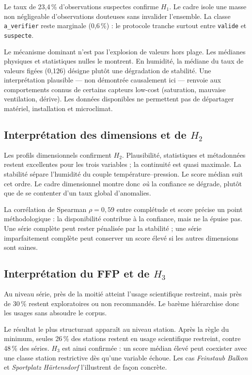 Le taux de 23,4\,\% d'observations suspectes confirme $H_1$. Le cadre isole une
masse non négligeable d'observations douteuses sans invalider l'ensemble. La
classe \texttt{a\_verifier} reste marginale (0,6\,\%) : le protocole tranche
surtout entre \texttt{valide} et \texttt{suspecte}.

Le mécanisme dominant n'est pas l'explosion de valeurs hors plage. Les médianes
physiques et statistiques nulles le montrent. En humidité, la médiane du taux
de valeurs figées (0,126) désigne plutôt une dégradation de stabilité. Une
interprétation plausible --- non démontrée causalement ici --- renvoie aux
comportements connus de certains capteurs low-cost (saturation, mauvaise
ventilation, dérive). Les données disponibles ne permettent pas de départager
matériel, installation et microclimat.

\subsection{Interprétation des dimensions et de $H_2$}

Les profils dimensionnels confirment $H_2$. Plausibilité, statistiques et
métadonnées restent excellentes pour les trois variables ; la continuité est
quasi maximale. La stabilité sépare l'humidité du couple température--pression.
Le score médian suit cet ordre. Le cadre dimensionnel montre donc
\textit{où} la confiance se dégrade, plutôt que de se contenter d'un taux
global d'anomalies.

La corrélation de Spearman $\rho=0,59$ entre complétude et score précise un
point méthodologique : la disponibilité contribue à la confiance, mais ne la
épuise pas. Une série complète peut rester pénalisée par la stabilité ; une
série imparfaitement complète peut conserver un score élevé si les autres
dimensions sont saines.

\subsection{Interprétation du FFP et de $H_3$}

Au niveau série, près de la moitié atteint l'usage scientifique restreint, mais
près de 30\,\% restent exploratoires ou non recommandés. Le barème hiérarchise
donc les usages sans absoudre le corpus.

Le résultat le plus structurant apparaît au niveau station. Après la règle du
minimum, seules 26\,\% des stations restent en usage scientifique restreint,
contre 48\,\% des séries. $H_3$ est ainsi confirmée : un score médian élevé peut
coexister avec une classe station restrictive dès qu'une variable échoue. Les
cas \textit{Feinstaub Balkon} et \textit{Sportplatz Härtensdorf} l'illustrent
de façon concrète.

